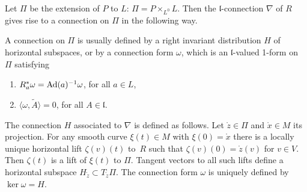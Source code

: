 \documentclass[pdftex]{sigma}%
\newcommand{\lf}{\mathfrak l}
\numberwithin{equation}{section}
\begin{document}
	Let $\Pi$ be the extension of $P$ to $L$: $\Pi = P\times_{L^0} L$. Then the $\lf$-connection $\nabla$ of $R$ gives rise to a connection on $\Pi$ in the following way.
	
A connection on $\Pi$ is usually defined by a right invariant distribution $H$ of horizontal subspaces, or by a connection form $\omega$, which is an $\lf$-valued 1-form on $\Pi$ satisfying
	\begin{enumerate}\itemsep=0pt
		\item[$(i)$] $R_a^*\omega ={\rm Ad}(a)^{-1}\omega$, for all $a\in L$,
		\item[$(ii)$] $\langle \omega, \tilde{A}\rangle=0$, for all $A\in \lf$.
	\end{enumerate}


	
	The connection $H$ associated to $\nabla$ is defined as follows. Let $\mathring{z}\in \Pi$ and $\mathring{x}\in M$ its projection. For any smooth curve $\xi(t)\in M$ with $\xi(0)=\mathring{x}$ there is a locally unique horizontal lift $\zeta(v)(t)$ to~$R$ such that $\zeta(v)(0)=\mathring{z}(v)$ for $v\in V$. Then $\zeta(t)$ is a lift of $\xi(t)$ to $\Pi$. Tangent vectors to all such lifts define a horizontal subspace $H_{\mathring{z}}\subset T_{\mathring{z}}\Pi$. The connection form $\omega$ is uniquely defined by~$\ker \omega=H$.
	
\end{document}
